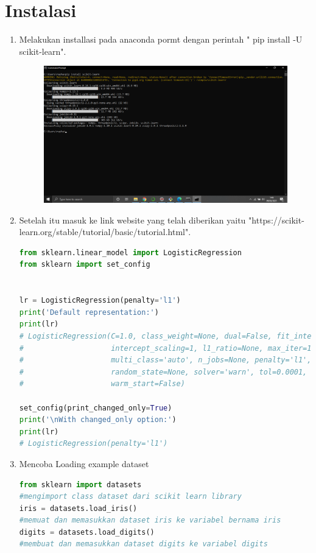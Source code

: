 \section{Instalasi}
\begin{enumerate}
\item Melakukan installasi pada anaconda pormt dengan perintah " pip install -U scikit-learn".
    \begin{figure}[!htbp]
    \centering
    \includegraphics[scale=0.4]{figures/install.PNG}
    \end{figure}
    \newpage
    \item Setelah itu masuk ke link website yang telah diberikan yaitu "https://scikit-learn.org/stable/tutorial/basic/tutorial.html".
    \begin{lstlisting}[language=Python]
from sklearn.linear_model import LogisticRegression
from sklearn import set_config


lr = LogisticRegression(penalty='l1')
print('Default representation:')
print(lr)
# LogisticRegression(C=1.0, class_weight=None, dual=False, fit_intercept=True,
#                    intercept_scaling=1, l1_ratio=None, max_iter=100,
#                    multi_class='auto', n_jobs=None, penalty='l1',
#                    random_state=None, solver='warn', tol=0.0001, verbose=0,
#                    warm_start=False)

set_config(print_changed_only=True)
print('\nWith changed_only option:')
print(lr)
# LogisticRegression(penalty='l1')
\end{lstlisting}
\item Mencoba Loading example dataset
 \begin{lstlisting}[language=Python]
from sklearn import datasets 
#mengimport class dataset dari scikit learn library
iris = datasets.load_iris() 
#memuat dan memasukkan dataset iris ke variabel bernama iris
digits = datasets.load_digits() 
#membuat dan memasukkan dataset digits ke variabel digits


\end{lstlisting}
\end{enumerate}
